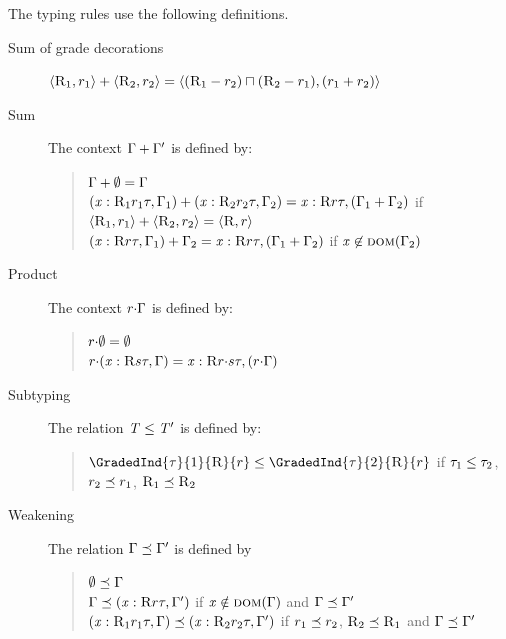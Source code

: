 The typing rules use the following definitions.
\begin{description}

\item[Sum of grade decorations]  $\langle {\textsc{R}_1},{r_1} \rangle+\langle {\textsc{R}_2},{r_2} \rangle=\langle {(\textsc{R}_1 -r_2) \sqcap(\textsc{R}_2 -r_1)},{(r_1+r_2)} \rangle$


\item[Sum] The context $\Gamma+\Gamma'$ is defined by:
\begin{quote}
$\Gamma+\emptyset=\Gamma$\\
 $(\mathit{x} :\textsc{R}_1{r_1}{\tau}, \Gamma_1) +(\mathit{x} :\textsc{R}_2{r_2}{\tau}, \Gamma_2) = \mathit{x} :\textsc{R}{r}{\tau},(\Gamma_1+\Gamma_2)$ if $\langle {\textsc{R}_1},{r_1} \rangle+\langle {\textsc{R}_2},{r_2} \rangle=\langle {\textsc{R}},{r} \rangle$  \\  
$(\mathit{x} :\textsc{R}{r}{\tau}, \Gamma_1)+\Gamma_2=\mathit{x} :\textsc{R}{r}{\tau},(\Gamma_1+\Gamma_2)$ if $\mathit{x}\not\in\textsc{dom}(\Gamma_2)$
\end{quote}

\item[Product] The context $r{\cdot}\Gamma$ is defined by:
\begin{quote}
$r{\cdot}\emptyset=\emptyset$\\
$r{\cdot}(\mathit{x} :\textsc{R}{s}{\tau},\Gamma)=\mathit{x} :\textsc{R}{r{\cdot}s}{\tau},(r{\cdot}\Gamma)$
\end{quote}

\item[Subtyping] The relation $\mathit{T}\leq\mathit{T}'$ is defined by:
\begin{quote}
$\GradedInd{\tau}{1}{\Rgr}{\rgr}\subt\GradedInd{\tau}{2}{\Rgr}{\rgr}$ if $\tau_1\leq\tau_2$, $r_2\preceq r_1$, $\textsc{R}_1\preceq\textsc{R}_2$
\end{quote}


\item[Weakening]  The relation $\Gamma\preceq\Gamma'$ is defined by
\begin{quote}
$\emptyset\preceq\Gamma$\\
$\Gamma\preceq(\mathit{x} :\textsc{R}{r}{\tau}, \Gamma')$ if $\mathit{x}\notin \textsc{dom}(\Gamma)$ and $\Gamma \preceq \Gamma'$\\
$(\mathit{x} :\textsc{R}_1{r_1}{\tau},\Gamma) \preceq (\mathit{x} :\textsc{R}_2{r_2}{\tau}, \Gamma')$ if $r_1\preceq r_2$, $\textsc{R}_2\preceq\textsc{R}_1$ and $\Gamma \preceq \Gamma'$
\end{quote}
\end{description}
